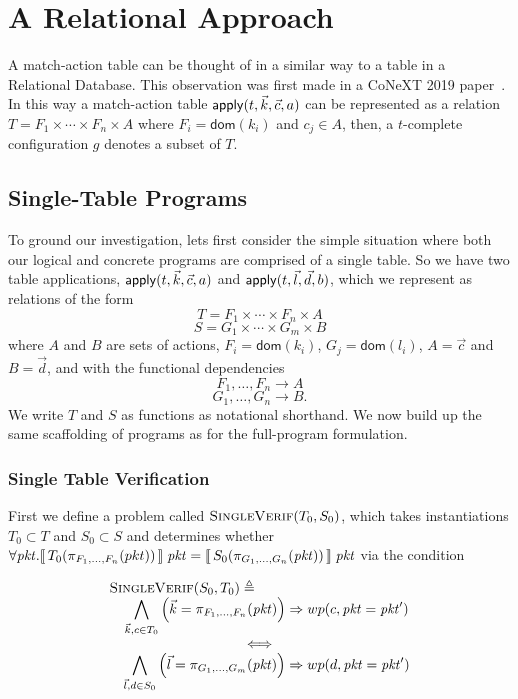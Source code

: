 \section{A Relational Approach}

A match-action table can be thought of in a similar way to a table in
a Relational Database. This observation was first made in a CoNeXT
2019 paper~\cite{Chiesa}. In this way a match-action table
$\mathsf{apply}(t, \vec k, \vec c, a)$ can be represented as a relation
$T = F_1 \times \cdots \times F_n \times A$ where
$F_i = \mathsf{dom}(k_i)$ and $c_j \in A$, then, a $t$-complete
configuration $g$ denotes a subset of $T$.

\subsection{Single-Table Programs}

To ground our investigation, lets first consider the simple situation
where both our logical and concrete programs are comprised of a single
table. So we have two table applications,
$\mathsf{apply}(t,\vec k, \vec c, a)$ and $\mathsf{apply}(t, \vec l, \vec d, b)$,
which we represent as relations of the form
\[T = F_1 \times \cdots \times F_n \times A\]
\[S = G_1 \times \cdots \times G_m \times B\] where $A$ and $B$ are
sets of actions, $F_i = \mathsf{dom}(k_i)$, $G_j = \mathsf{dom}(l_i)$,
$A = \vec c$ and $B = \vec d$, and with the functional dependencies
\[F_1, \ldots, F_n \to A\] \[G_1, \ldots, G_n \to B.\] We write $T$
and $S$ as functions as notational shorthand. We now build up the same
scaffolding of programs as for the full-program formulation.

\subsubsection{Single Table Verification}
First we define a problem called $\textsc{SingleVerif}(T_0, S_0)$,
which takes instantiations $T_0 \subset T$ and $S_0 \subset S$ and
determines whether
$\forall \mathit{pkt}. \llbracket\,T_0(\pi_{F_1,\ldots,F_n}(pkt))\,\rrbracket\;\mathit{pkt} =
\llbracket\,S_0(\pi_{G_1,\ldots,G_n}(\mathit{pkt}))\,\rrbracket\; \mathit{pkt}$ via the condition

\[\begin{array}c
    \multicolumn{1}{l}{\textsc{SingleVerif}(S_0,T_0) \triangleq}\\
    \displaystyle \quad \bigwedge_{\vec k, c \in T_0}\left(\vec k = \pi_{F_1,\ldots,F_n}(\pkt)\right) \Rightarrow wp(c,\pkt= \pkt')\\ \iff \\
    \displaystyle \quad \bigwedge_{\vec l, d \in S_0}\left(\vec l = \pi_{G_1,\ldots,G_m}(\pkt)\right) \Rightarrow wp(d, \pkt= \pkt')
  \end{array}
\]

